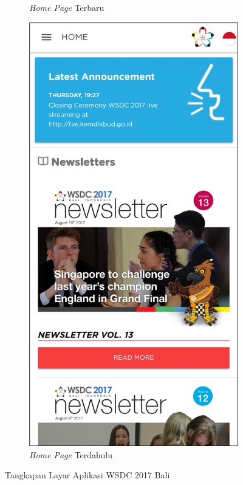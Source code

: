 \begin{figure}[H]
\begin{subfigure}[b]{0.3\textwidth}
         \caption{\textit{Home Page} Terbaru}
         \label{fig:ssHome}
     \end{subfigure}
     \hspace*{0.5in}
     \begin{subfigure}[b]{0.3\textwidth}
         \centering
         \includegraphics[width=\textwidth]{Gambar/HomePage.png}
         \caption{\textit{Home Page} Terdahulu}
         \label{fig:ssHomeOld}
     \end{subfigure}
        \caption{Tangkapan Layar Aplikasi WSDC 2017 Bali}
        \label{fig:ssApk1}
\end{figure}


